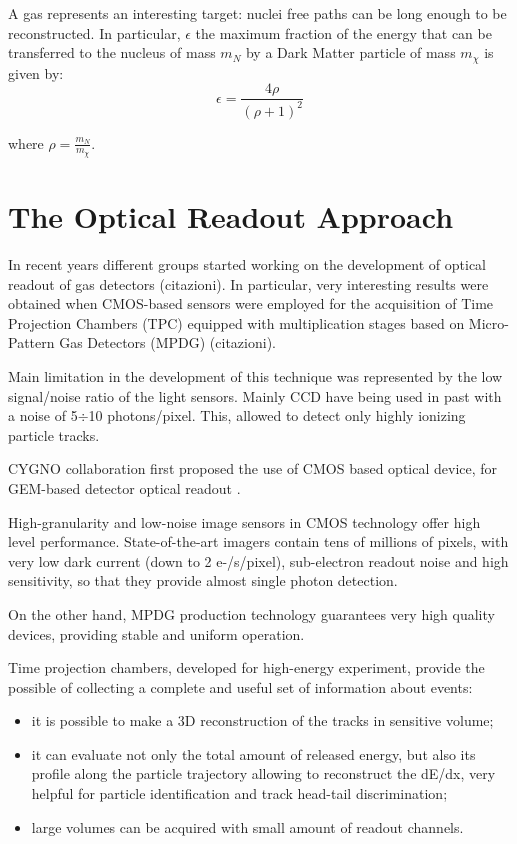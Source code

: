 \documentclass[review]{elsarticle}
\begin{document}
A gas represents an interesting target: nuclei free paths can be long enough to be reconstructed. 
In particular, $\epsilon$ the maximum fraction of the energy that can be
transferred to the nucleus of mass $m_N$ by a Dark Matter particle of mass
$m_{\chi}$ is given by:
\begin{equation}
\epsilon = \frac {4 \rho}{\left( \rho + 1 \right)^2}
\label{eq:trans}
\end{equation}

where $\rho = \frac{m_N}{m_{\chi}}$.


\section{The Optical Readout Approach}
\label{sect:opro}

In recent years different groups started working on the development of optical readout of gas detectors (citazioni). In particular, very interesting results were obtained when CMOS-based sensors were employed for the acquisition of Time Projection Chambers (TPC) equipped with multiplication stages based on Micro-Pattern Gas Detectors (MPDG) (citazioni).

Main limitation in the development of this technique was represented
by the low signal/noise ratio of the light sensors. Mainly CCD have being
used in past with a noise of 5$\div$10 photons/pixel. This, allowed to
detect only highly ionizing particle tracks.

CYGNO collaboration first proposed the use of CMOS based optical device, 
for GEM-based detector optical readout \cite{bib:orange1, bib:orange2, bib:orange3, bib:orange4, bib:elba}.


High-granularity and low-noise image sensors in CMOS technology offer high level performance. State-of-the-art imagers contain tens of millions of pixels, with very low dark current (down to 2 e-/s/pixel), sub-electron readout noise and high sensitivity, so that they provide almost single photon detection. 

On the other hand, MPDG production technology guarantees very high quality devices, providing stable and uniform operation.

Time projection chambers, developed for high-energy experiment, provide the possible of collecting a complete and useful set of information about events:
\begin{itemize}
    \item it is possible to make a 3D reconstruction of the tracks in sensitive volume;
    \item it can evaluate not only the total amount of released energy, but also its profile along the particle trajectory allowing to reconstruct the dE/dx, very helpful for particle identification and track head-tail discrimination;
    \item large volumes can be acquired with small amount of readout channels. 
\end{itemize}
\end{document}

